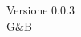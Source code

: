 \documentclass[12pt]{article}
\title{\myfont{Glossario}}
\author{Dream Corp.}
\date{ \myfont 05-12-2018}
\begin{document}
	\maketitle
	\begin{center}
	\huge Versione 0.0.3 
	\\G\&B
	\end{center}
	\tableofcontents
	
	
\end{document}
